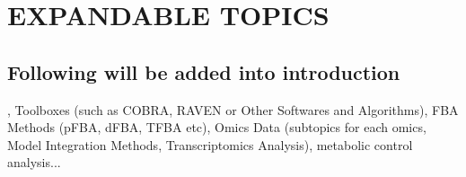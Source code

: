 \chapter{EXPANDABLE TOPICS}

\section{Following will be added into introduction}, Toolboxes (such as COBRA, RAVEN or Other Softwares and Algorithms), FBA Methods (pFBA, dFBA, TFBA etc), Omics Data (subtopics for each omics, Model Integration Methods, Transcriptomics Analysis), metabolic control analysis...
